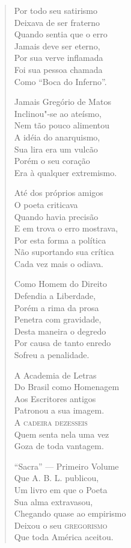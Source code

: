 \begin{verse}
Por todo seu satirismo \\
Deixava de ser fraterno \\
Quando sentia que o erro \\
Jamais deve ser eterno, \\
Por sua verve inflamada \\
Foi sua pessoa chamada \\
Como ``Boca do Inferno''. 

Jamais Gregório de Matos \\
Inclinou"-se ao ateísmo, \\
Nem tão pouco alimentou \\
A idéia do anarquismo, \\
Sua lira era um vulcão \\
Porém o seu coração \\
Era à qualquer extremismo. 

Até dos próprios amigos \\
O poeta criticava \\
Quando havia precisão \\
E em trova o erro mostrava, \\
Por esta forma a política \\
Não suportando sua crítica \\
Cada vez mais o odiava. 
\pagebreak

Como Homem do Direito \\
Defendia a Liberdade, \\
Porém a rima da prosa \\
Penetra com gravidade, \\
Desta maneira o degredo \\
Por causa de tanto enredo \\
Sofreu a penalidade. 

A Academia de Letras \\
Do Brasil como Homenagem \\
Aos Escritores antigos \\
Patronou a sua imagem. \\
A \textsc{cadeira dezesseis} \\
Quem senta nela uma vez \\
Goza de toda vantagem. 

``Sacra'' --- Primeiro Volume \\
Que A. B. L. publicou, \\
Um livro em que o Poeta \\
Sua alma extravasou, \\
Chegando quase ao empirismo \\
Deixou o seu \textsc{gregorismo} \\
Que toda América aceitou. 


\end{verse}
